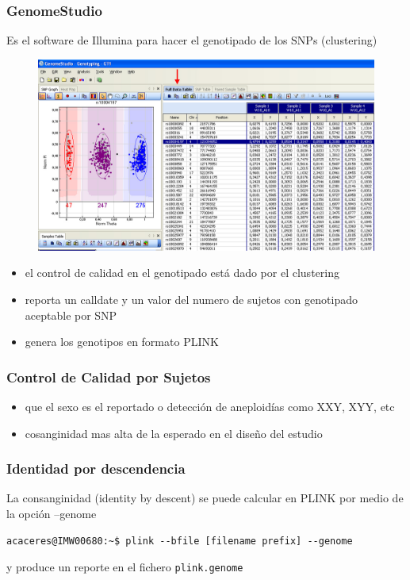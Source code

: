 \documentclass{beamer}\usepackage[]{graphicx}\usepackage[]{color}
\begin{document}
\begin{frame}[fragile]
\frametitle{GenomeStudio}

Es el software de Illumina para hacer el genotipado de los SNPs (clustering)
\begin{figure}[htbp]
\begin{center}
\includegraphics[width=.6\linewidth]{genomestudio.jpg}
\end{center}
\end{figure}

\begin{itemize}
\item el control de calidad en el genotipado est\'a dado por el clustering
\item reporta un calldate y un valor del numero de sujetos con genotipado aceptable por SNP 
\item genera los genotipos en formato PLINK 
\end{itemize}

\end{frame}


\begin{frame}[fragile]
\frametitle{Control de Calidad por Sujetos}

\begin{itemize}
\item que el sexo es el reportado o detecci\'on de aneploidías como XXY, XYY, etc 
\item cosanginidad mas alta de la esperado en el diseño del estudio 
\end{itemize}

\end{frame}


\begin{frame}[fragile]
\frametitle{Identidad por descendencia}

La consanginidad (identity by descent) se puede calcular en PLINK por medio de la opci\'on --genome

\begin{verbatim}
acaceres@IMW00680:~$ plink --bfile [filename prefix] --genome 
\end{verbatim}

y produce un reporte en el fichero {\tt plink.genome}
\end{frame}
\end{document}

